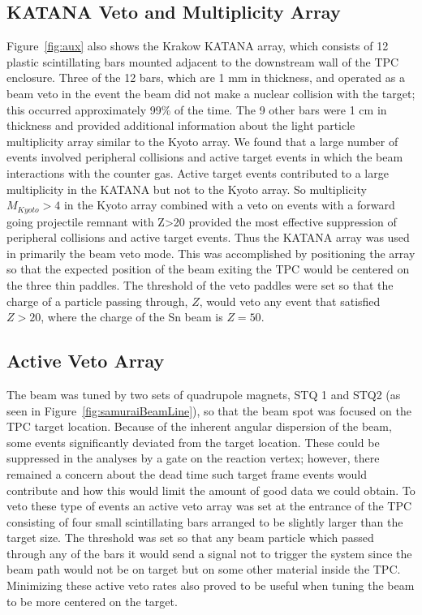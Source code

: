 \subsection{KATANA Veto and Multiplicity Array}
 Figure~\ref{fig:aux} also shows the Krakow KATANA array, which consists of 12 plastic scintillating bars mounted adjacent to the downstream wall of the TPC enclosure. Three of the 12 bars, which are 1 mm in thickness, and operated as a beam veto in the event the beam did not make a nuclear collision with the target; this occurred approximately 99\% of the time. The 9 other bars were 1 cm in thickness and provided additional information about the light particle multiplicity array similar to the Kyoto array. We found that a large number of events involved peripheral collisions and active target events in which the beam interactions with the counter gas. Active target events contributed to a large multiplicity in the KATANA but not to the Kyoto array. So multiplicity $M_{Kyoto} > 4$ in the Kyoto array combined with a veto on events with a forward going projectile remnant with Z>20 provided the most effective suppression of peripheral collisions and active target events. Thus the KATANA array was used in primarily the beam veto mode. This was accomplished by positioning the array so that the expected position of the beam exiting the TPC would be centered on the three thin paddles. The threshold of the veto paddles were set so that the charge of a particle passing through, $Z$, would veto any event that satisfied $Z > 20$, where the charge of the Sn beam is $Z=50$. 


\subsection{Active Veto Array}
The beam was tuned by two sets of quadrupole  magnets, STQ 1 and STQ2 (as seen in Figure~\ref{fig:samuraiBeamLine}), so that the beam spot was focused on the TPC target location. Because of the inherent angular dispersion of the beam, some events significantly deviated from the target location. These could be suppressed in the analyses by a gate on the reaction vertex; however, there remained a concern about the dead time such target frame events would contribute and how this would limit the amount of good data we could obtain.  To veto these type of events an active veto array was set at the entrance of the TPC consisting of four small scintillating bars arranged to be slightly larger than the target size. The threshold was set so that any beam particle which passed through any of the bars it would send a signal not to trigger the system since the beam path would not be on target but on some other material inside the TPC. Minimizing these active veto rates also proved to be useful when tuning the beam to be more centered on the target.


